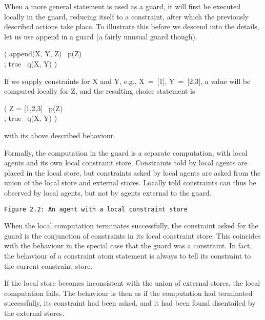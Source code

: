 When a more general statement is used as a guard, it will first be
executed locally in the guard, reducing itself to a constraint, after
which the previously described actions take place.  To illustrate this
before we descend into the details, let us use append in a guard (a
fairly unusual guard though).
%
\begin{progex}
( append(X, Y, Z) \cond\ p(Z) \\
; true \cond\ q(X, Y) )
\end{progex}%
%
If we supply constraints for {\prog X} and {\prog Y}, e.g., {\prog
X~=~[1]}, {\prog Y~=~[2,3]}, a value will be computed locally for
{\prog Z}, and the resulting choice statement is
%
\begin{progex}
( Z = [1,2,3] \cond\ p(Z) \\
; true \cond\ q(X, Y) )
\end{progex}%
%
with its above described behaviour.

Formally, the computation in the guard is a separate computation, with
local agents and its own local constraint store.  Constraints told by
local agents are placed in the local store, but constraints asked by
local agents are asked from the union of the local store and external
stores.  Locally told constraints can thus be observed by local agents,
but not by agents external to the guard.
                                             
\verb|Figure 2.2: An agent with a local constraint store|

When the local computation terminates successfully, the constraint
asked for the guard is the conjunction of constraints in its local
constraint store.  This coincides with the behaviour in the special
case that the guard was a constraint.  In fact, the behaviour of a
constraint atom statement is always to tell its constraint to the
current constraint store.

If the local store becomes inconsistent with the union of external
stores, the local computation fails.  The behaviour is then as if the
computation had terminated successfully, its constraint had been
asked, and it had been found disentailed by the external stores.

